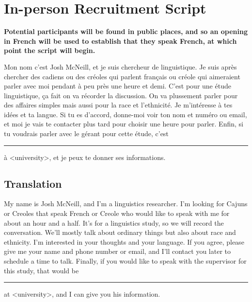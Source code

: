 
\ifdefined \longtrans
\else
  \newcommand{\longtrans}[1]{\[#1\]}
\fi
\ifdefined \setting
\else
  \newcommand{\setting}[1]{\textbf{#1}}
\fi

\section{In-person Recruitment Script}
  \setting{Potential participants will be found in public places, and so an opening in French will be used to establish that they speak French, at which point the script will begin.}

  \noindent{}Mon nom c'est Josh McNeill, et je suis chercheur de linguistique.
  Je suis après chercher des cadiens ou des créoles qui parlent français ou créole qui aimeraient parler avec moi pendant à peu près une heure et demi.
  C'est pour une étude linguistique, ça fait on va récorder la discussion.
  On va plussement parler pour des affaires simples mais aussi pour la race et l'ethnicité.
  Je m'intéresse à tes idées et ta langue.
  Si tu es d'accord, donne-moi voir ton nom et numéro ou email, et moi je vais te contacter plus tard pour choisir une heure pour parler.
  Enfin, si tu voudrais parler avec le gérant pour cette étude, c'est \rule{3cm}{0.4pt} à <university>, et je peux te donner ses informations.

  \subsection*{Translation}
    My name is Josh McNeill, and I'm a linguistics researcher.
    I'm looking for Cajuns or Creoles that speak French or Creole who would like to speak with me for about an hour and a half.
    It's for a linguistics study, so we will record the conversation.
    We'll mostly talk about ordinary things but also about race and ethnicity.
    I'm interested in your thoughts and your language.
    If you agree, please give me your name and phone number or email, and I'll contact you later to schedule a time to talk.
    Finally, if you would like to speak with the supervisor for this study, that would be \rule{3cm}{0.4pt} at <university>, and I can give you his information.

